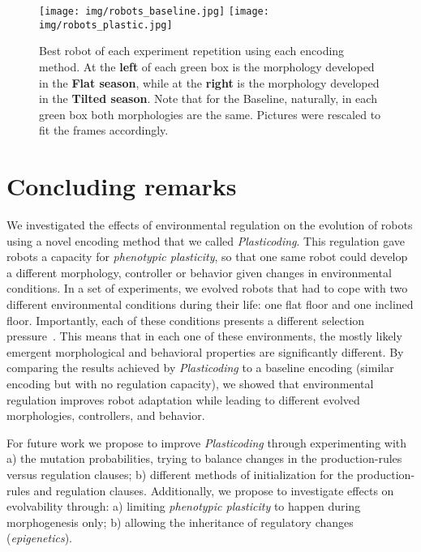 \documentclass[utf8]{frontiersSCNS} %
\begin{document}
\begin{figure}[t]
 \centering
    \texttt{[image: img/robots\_baseline.jpg]}
     \texttt{[image: img/robots\_plastic.jpg]}
    \caption{Best robot of each experiment repetition using each encoding method. At the \textbf{left} of each green box is the morphology developed in the \textbf{Flat season}, while at the \textbf{right} is the morphology developed in the \textbf{Tilted season}. Note that for the Baseline, naturally, in each green box both morphologies are the same. Pictures were rescaled to fit the frames accordingly.}
    \label{fig:robots_best}
 
\end{figure}



\section{Concluding remarks}

We investigated the effects of environmental regulation on the evolution of robots using a novel encoding method that we called \textit{Plasticoding}. This regulation gave robots a capacity for \textit{phenotypic plasticity}, so that one same robot could develop a different morphology, controller or behavior given changes in environmental conditions. In a set of experiments, we evolved robots that had to cope with two different environmental conditions during their life: one flat floor and one inclined floor. Importantly, each of these conditions presents a different selection pressure~\citep{miras2019impact}. This means that in each one of these environments, the mostly likely emergent morphological and behavioral properties are significantly different. By comparing the results achieved by \textit{Plasticoding} to a baseline encoding (similar encoding but with no regulation capacity), we showed that environmental regulation improves robot adaptation while leading to different evolved morphologies, controllers, and behavior.
 
For future work we propose to improve \textit{Plasticoding} through experimenting with a) the mutation probabilities, trying to balance changes in the production-rules versus regulation clauses; b) different methods of initialization for the production-rules and regulation clauses. Additionally, we propose to investigate effects on evolvability through: a) limiting \textit{phenotypic plasticity} to happen during morphogenesis only; b) allowing the inheritance of regulatory changes (\textit{epigenetics}).
 
\end{document}

